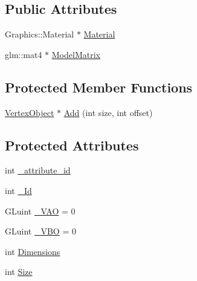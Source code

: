 \subsection*{Public Attributes}
\begin{DoxyCompactItemize}
\item 
Graphics\+::\+Material $\ast$ \mbox{\hyperlink{classEngine_1_1Components_1_1Objects_1_1VertexObject_a86c1fced4cdc5e59a66a635390a17eca}{Material}}
\item 
glm\+::mat4 $\ast$ \mbox{\hyperlink{classEngine_1_1Objects_1_1Object_acf41cc091fa270053245ed26bc28c8a4}{Model\+Matrix}}
\end{DoxyCompactItemize}
\subsection*{Protected Member Functions}
\begin{DoxyCompactItemize}
\item 
\mbox{\hyperlink{classEngine_1_1Components_1_1Objects_1_1VertexObject_a2cd67c7ea4baefd945c5045d2a775a5d}{Vertex\+Object}} $\ast$ \mbox{\hyperlink{classEngine_1_1Components_1_1Objects_1_1VertexObject_a18550cae56ca1066792528a7dcf5d28a}{Add}} (int size, int offset)
\end{DoxyCompactItemize}
\subsection*{Protected Attributes}
\begin{DoxyCompactItemize}
\item 
int \mbox{\hyperlink{classEngine_1_1Components_1_1Objects_1_1VertexObject_a401aa1eb0254e57d8295c2287749eed5}{\+\_\+attribute\+\_\+id}}
\item 
int \mbox{\hyperlink{classEngine_1_1Components_1_1Objects_1_1VertexObject_aa76ac755e9e37853a778795f0a0ad15e}{\+\_\+\+Id}}
\item 
G\+Luint \mbox{\hyperlink{classEngine_1_1Components_1_1Objects_1_1VertexObject_ae85ac9d5ded8f54d58feb7fb78e75130}{\+\_\+\+V\+AO}} = 0
\item 
G\+Luint \mbox{\hyperlink{classEngine_1_1Components_1_1Objects_1_1VertexObject_a79e171ffe4b9342d76c0c729a9836fd2}{\+\_\+\+V\+BO}} = 0
\item 
int \mbox{\hyperlink{classEngine_1_1Components_1_1Objects_1_1VertexObject_ae5bb104a878dc8a3c909ec9b0ee799c1}{Dimensions}}
\item 
int \mbox{\hyperlink{classEngine_1_1Components_1_1Objects_1_1VertexObject_a13ec6e4a92520bdd1b33ad6de757cb92}{Size}}
\end{DoxyCompactItemize}
